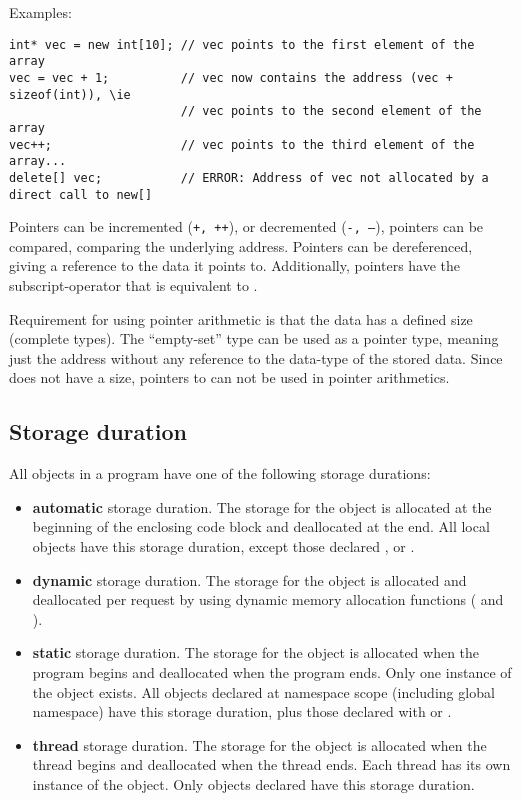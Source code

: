 Examples:
\begin{verbatim}
int* vec = new int[10]; // vec points to the first element of the array
vec = vec + 1;          // vec now contains the address (vec + sizeof(int)), \ie
                        // vec points to the second element of the array
vec++;                  // vec points to the third element of the array...
delete[] vec;           // ERROR: Address of vec not allocated by a direct call to new[]
\end{verbatim}

Pointers can be incremented (\texttt{+, ++}), or decremented (\texttt{-, --}), pointers can be compared, comparing the underlying address.
Pointers can be dereferenced, giving a reference to the data it points to. Additionally, pointers have the subscript-operator \cpp{[n]} that is
equivalent to .

Requirement for using pointer arithmetic is that the data has a defined size (complete types). The ``empty-set'' type  can be used as a pointer type,
meaning just the address without any reference to the data-type of the stored data. Since  does not have a size, pointers to  can not
be used in pointer arithmetics.


\subsection{Storage duration}
All objects in a program have one of the following storage durations:
\begin{itemize}
  \item \textbf{automatic} storage duration. The storage for the object is allocated at the beginning of the enclosing code block and deallocated at the end. All local objects have this storage duration, except those declared ,  or .

  \item \textbf{dynamic} storage duration. The storage for the object is allocated and deallocated per request by using dynamic memory allocation functions ( and ).

  \item \textbf{static} storage duration. The storage for the object is allocated when the program begins and deallocated when the program ends. Only one instance of the object exists. All objects declared at namespace scope (including global namespace) have this storage duration, plus those declared with  or .

  \item \textbf{thread} storage duration. The storage for the object is allocated when the thread begins and deallocated when the thread ends. Each thread has its own instance of the object. Only objects declared  have this storage duration.
\end{itemize}

